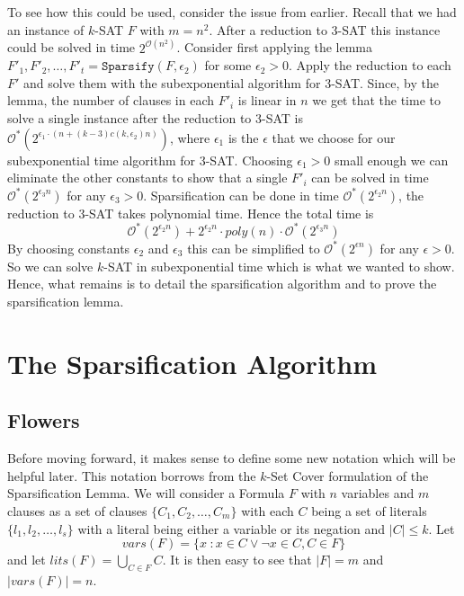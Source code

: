 To see how this could be used, consider the issue from earlier.
Recall that we had an instance of $k$-SAT $F$ with $m = n^2$.
After a reduction to 3-SAT this instance could be solved in time $2^{\mathcal{O}(n^2)}$.
Consider first applying the lemma $F'_1, F'_2, \dots, F'_t = \texttt{Sparsify}(F, \epsilon_2)$ for some $\epsilon_2 > 0$.
Apply the reduction to each $F'$ and solve them with the subexponential algorithm for 3-SAT.
Since, by the lemma, the number of clauses in each $F'_i$ is linear in $n$ we get that the time to solve a single
instance after the reduction to 3-SAT is $\mathcal{O}^{\ast}(2^{\epsilon_1 \cdot (n + (k-3)c(k, \epsilon_2)n )})$, 
where $\epsilon_1$ is the $\epsilon$ that we choose for our subexponential time algorithm for 3-SAT.
Choosing $\epsilon_1 > 0$ small enough we can eliminate the other constants to show that
a single $F'_i$ can be solved in time $\mathcal{O}^{\ast}(2^{\epsilon_3 n})$
for any $\epsilon_3 > 0$.
Sparsification can be done in time $\mathcal{O}^{\ast}(2^{\epsilon_2 n})$, the reduction to 3-SAT takes polynomial time.
Hence the total time is
\begin{equation} \label{eq:run_time}
    \mathcal{O}^{\ast}(2^{\epsilon_2 n}) + 2^{\epsilon_2 n} \cdot poly(n) \cdot \mathcal{O}^{\ast}(2^{\epsilon_3 n})
\end{equation}
By choosing constants $\epsilon_2$ and $\epsilon_3$ this can be simplified
to $\mathcal{O}^{\ast}(2^{\epsilon n})$ for any $\epsilon > 0$. So we can solve $k$-SAT in subexponential time
which is what we wanted to show.
Hence, what remains is to detail the sparsification algorithm and to prove the sparsification lemma.


\section{The Sparsification Algorithm}
\subsection{Flowers}
Before moving forward, it makes sense to define some new notation which will
be helpful later. This notation borrows from the $k$-Set Cover formulation of the
Sparsification Lemma. We will consider a Formula $F$ with $n$ variables and $m$ clauses
as a set of clauses $\{C_1, C_2, \dots, C_m\}$
with each $C$ being a set of literals $\{l_1, l_2, \dots, l_s\}$ 
with a literal being either a variable or its negation and $|C| \leq k$.
Let $$vars(F) = \{x \hspace{3pt} : x \in C \lor \neg x \in C, C \in F\}$$
and let $lits(F) = \bigcup_{C \in F}C$. It is then easy
to see that $|F| = m$ and $|vars(F)| = n$.

